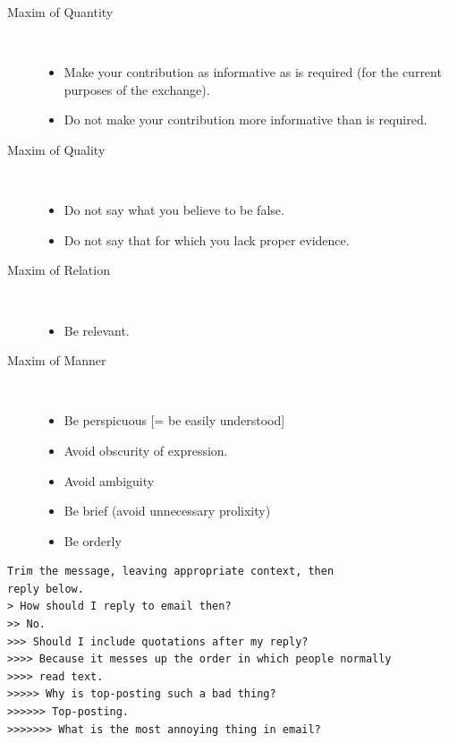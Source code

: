 \documentclass[a4paper,landscape,headrule,footrule,xetex]{foils}
\begin{document}
\begin{description}
\item [Maxim of Quantity] ~
  \begin{itemize}
  \item Make your contribution as informative as is required (for the current purposes of the exchange).
  \item Do not make your contribution more informative than is required.
  \end{itemize}
\item [Maxim of Quality] ~
  \begin{itemize}
  \item Do not say what you believe to be false.
  \item Do not say that for which you lack proper evidence.
  \end{itemize}
\newpage
\item [Maxim of Relation] ~
  \begin{itemize}
  \item Be relevant.
  \end{itemize}
\item [Maxim of Manner] ~
  \begin{itemize}
  \item Be perspicuous [= be easily understood]
  \item Avoid obscurity of expression.
  \item Avoid ambiguity
  \item Be brief (avoid unnecessary prolixity)
  \item Be orderly
  \end{itemize}
\end{description}




\begin{verbatim}
Trim the message, leaving appropriate context, then 
reply below.
> How should I reply to email then?
>> No.
>>> Should I include quotations after my reply?
>>>> Because it messes up the order in which people normally 
>>>> read text.
>>>>> Why is top-posting such a bad thing?
>>>>>> Top-posting.
>>>>>>> What is the most annoying thing in email?
\end{verbatim}

\end{document}
